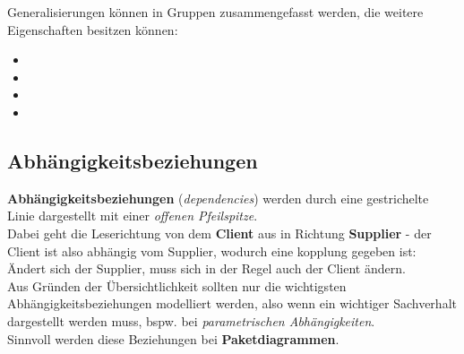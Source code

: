 \noindent
Generalisierungen können in Gruppen zusammengefasst werden, die weitere Eigenschaften besitzen können:

\begin{itemize}
    \item {}
    \item {}
    \item {}
    \item {}
\end{itemize}

\subsection*{Abhängigkeitsbeziehungen}
\textbf{Abhängigkeitsbeziehungen} (\textit{dependencies}) werden durch eine gestrichelte Linie dargestellt mit einer \textit{offenen Pfeilspitze}.\\
Dabei geht die Leserichtung von dem \textbf{Client} aus in Richtung \textbf{Supplier} - der Client ist also abhängig vom Supplier, wodurch eine kopplung gegeben ist: Ändert sich der Supplier, muss sich in der Regel auch der Client ändern.\\

\noindent
Aus Gründen der Übersichtlichkeit sollten nur die wichtigsten Abhängigkeitsbeziehungen modelliert werden, also wenn ein wichtiger Sachverhalt dargestellt werden muss, bspw. bei \textit{parametrischen Abhängigkeiten}.\\
Sinnvoll werden diese Beziehungen bei \textbf{Paketdiagrammen}.
